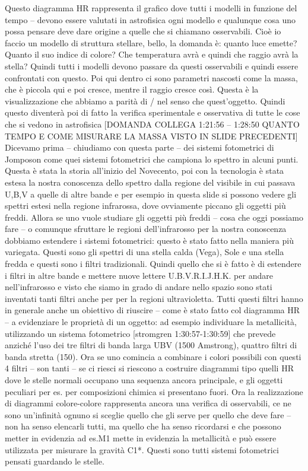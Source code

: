 \documentclass[a4paper,11pt]{article}
\begin{document}
\newline
Questo diagramma HR rappresenta il grafico dove tutti i modelli  in funzione del tempo –  devono essere valutati in astrofisica ogni modello e qualunque cosa uno possa pensare deve dare origine a quelle che si chiamano osservabili. Cioè io faccio un modello di struttura stellare, bello, la domanda è: quanto luce emette? Quanto il suo indice di colore? Che temperatura avrà e quindi che raggio avrà la stella? Quindi tutti i modelli devono passare da questi osservabili e quindi essere confrontati con questo. Poi qui dentro ci sono parametri nascosti come la massa, che è piccola qui e poi cresce, mentre il raggio cresce così. Questa è la visualizzazione che abbiamo a parità di / nel senso che quest’oggetto. Quindi questo diventerà poi di fatto la verifica sperimentale e osservativa di tutte le cose che si vedono in astrofisica [DOMANDA COLLEGA 1:21:56 – 1:28:50 QUANTO TEMPO E COME MISURARE LA MASSA VISTO IN SLIDE PRECEDENTI]
Dicevamo prima – chiudiamo con questa parte – dei sistemi fotometrici di Jomposon come quei sistemi fotometrici che campiona lo spettro in alcuni punti. Questa è stata la storia all’inizio del Novecento, poi con la tecnologia è stata estesa la nostra conoscenza dello spettro dalla regione del visibile in cui passava U,B,V a quelle di altre bande e per esempio in questa slide si possono vedere gli spettri estesi nella regione infrarossa, dove ovviamente piccano gli oggetti più freddi. Allora se uno vuole studiare gli oggetti più freddi – cosa che oggi possiamo fare – o comunque sfruttare le regioni dell’infrarosso per la nostra conoscenza dobbiamo estendere i sistemi fotometrici: questo è stato fatto nella maniera più variegata. Questi sono gli spettri di una stella calda (Vega), Sole e una stella fredda e questi sono i filtri tradizionali. Quindi quello che si è fatto è di estendere i filtri in altre bande e mettere nuove lettere U.B.V.R.I.J.H.K. per andare nell’infrarosso e visto che siamo in grado di andare nello spazio sono stati inventati tanti filtri anche per per la regioni ultravioletta. Tutti questi filtri hanno in generale anche un obiettivo di riuscire – come è stato fatto col diagramma HR – a evidenziare le proprietà di un oggetto: ad esempio individuare la metallicità, utilizzando un sistema fotometrico [stromgren 1:30:57-1:30:59] che prevede anziché l’uso dei tre filtri di banda larga UBV (1500 Amstrong), quattro filtri di banda stretta (150). Ora se uno comincia a combinare i colori possibili con questi 4 filtri – son tanti – se ci riesci si riescono a costruire diagrammi tipo quelli HR dove le stelle normali occupano una sequenza ancora principale, e gli oggetti peculiari per es. per composizioni chimica si presentano fuori. Ora la realizzazione di diagrammi colore-colore rappresenta ancora una verifica di osservabili, ce ne sono un’infinità ognuno si sceglie quello che gli serve per quello che deve fare – non ha senso elencarli tutti, ma quello che ha senso ricordarsi e che possono metter in evidenzia ad es.M1 mette in evidenzia la metallicità e può essere utilizzata per misurare la gravità C1*. Questi sono tutti sistemi fotometrici pensati guardando le stelle. 
\end{document}
